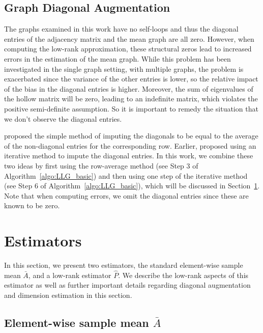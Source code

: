 \subsection{Graph Diagonal Augmentation}
\label{sec:diag_aug}
The graphs examined in this work have no self-loops and thus the diagonal entries of the adjacency matrix and the mean graph are all zero.
However, when computing the low-rank approximation, these structural zeros lead to increased errors in the estimation of the mean graph. 
While this problem has been investigated in the single graph setting, with multiple graphs, the problem is exacerbated since the variance of the other entries is lower, so the relative impact of the bias in the diagonal entries is higher.
Moreover, the sum of eigenvalues of the hollow matrix will be zero, leading to an indefinite matrix, which violates the positive semi-definite assumption. So it is important to remedy the situation that we don't observe the diagonal entries.

\citet{marchette2011vertex}  proposed the simple method of imputing the diagonals to be equal to the average of the non-diagonal entries for the corresponding row.
Earlier, \citet{scheinerman2010modeling} proposed using an iterative method to impute the diagonal entries.
In this work, we combine these two ideas by first using the row-average method  (see Step 3 of Algorithm~\ref{algo:LLG_basic}) and then using one step of the iterative method (see Step 6 of Algorithm~\ref{algo:LLG_basic}), which will be discussed in Section~\ref{sec:LLG_estimator}.
Note that when computing errors, we omit the diagonal entries since these are known to be zero.








\section{Estimators}
\label{sec:LLG_estimator}

In this section, we present two estimators, the standard element-wise sample mean $\bar{A}$, and a low-rank estimator $\hat{P}$. We describe the low-rank aspects of this estimator as well as further important details regarding diagonal augmentation and dimension estimation in this section.


\subsection[Element-wise sample mean]{Element-wise sample mean $\bar{A}$}
\label{sec:LLG_abar}

